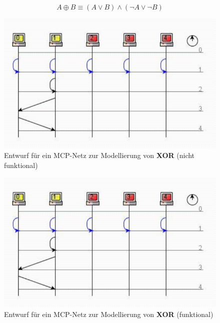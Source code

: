 {\begin{equation}
A \oplus B \equiv (A \lor B) \land (\neg A \lor \neg B)
\label{eq:gl-xorcon}
\end{equation}


\begin{figure}[h]
    \centering
    \includegraphics{images/p1ReadSeq.pdf}
    \caption{Entwurf für ein MCP-Netz zur Modellierung von \textbf{XOR} (nicht funktional)}
    \label{fig-mcpxornf}
\end{figure}

\begin{figure}[h]
    \centering
    \includegraphics{images/p1ReadSeq.pdf}
    \caption{Entwurf für ein MCP-Netz zur Modellierung von \textbf{XOR} (funktional)}
    \label{fig-mcpxorf}
\end{figure}


\noindent{}


}
